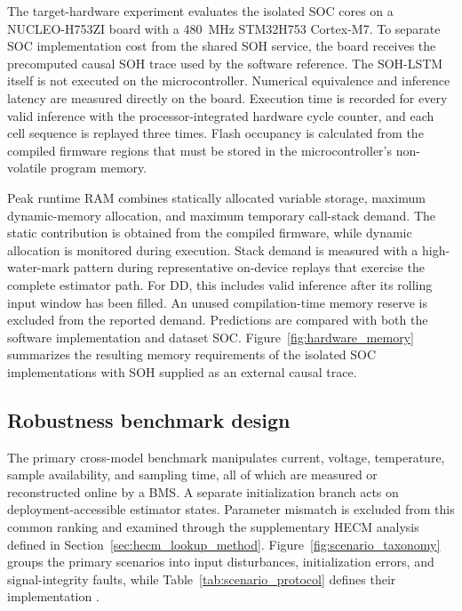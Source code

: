 \documentclass[review,nopreprintline]{elsarticle}
\begin{document}
The target-hardware experiment evaluates the isolated SOC cores on a NUCLEO-H753ZI board with a \SI{480}{MHz} STM32H753 Cortex-M7. To separate SOC implementation cost from the shared SOH service, the board receives the precomputed causal SOH trace used by the software reference. The SOH-LSTM itself is not executed on the microcontroller. Numerical equivalence and inference latency are measured directly on the board. Execution time is recorded for every valid inference with the processor-integrated hardware cycle counter, and each cell sequence is replayed three times. Flash occupancy is calculated from the compiled firmware regions that must be stored in the microcontroller's non-volatile program memory.

Peak runtime RAM combines statically allocated variable storage, maximum dynamic-memory allocation, and maximum temporary call-stack demand. The static contribution is obtained from the compiled firmware, while dynamic allocation is monitored during execution. Stack demand is measured with a high-water-mark pattern during representative on-device replays that exercise the complete estimator path. For DD, this includes valid inference after its rolling input window has been filled. An unused compilation-time memory reserve is excluded from the reported demand. Predictions are compared with both the software implementation and dataset SOC. Figure~\ref{fig:hardware_memory} summarizes the resulting memory requirements of the isolated SOC implementations with SOH supplied as an external causal trace.

\subsection{Robustness benchmark design}
The primary cross-model benchmark manipulates current, voltage, temperature, sample availability, and sampling time, all of which are measured or reconstructed online by a BMS. A separate initialization branch acts on deployment-accessible estimator states. Parameter mismatch is excluded from this common ranking and examined through the supplementary HECM analysis defined in Section~\ref{sec:hecm_lookup_method}. Figure~\ref{fig:scenario_taxonomy} groups the primary scenarios into input disturbances, initialization errors, and signal-integrity faults, while Table~\ref{tab:scenario_protocol} defines their implementation \cite{bergerBenchmarkingBatteryManagement2024}.
\end{document}
